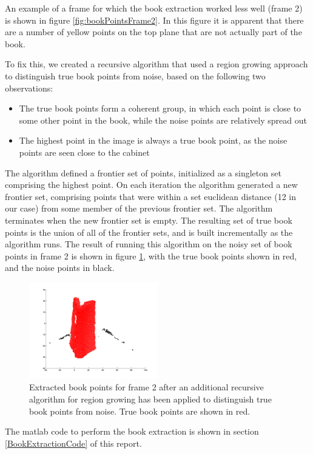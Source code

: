 An example of a frame for which the book extraction worked less well (frame 2) is shown in figure \ref{fig:bookPointsFrame2}. In this figure it is apparent that there are a number of yellow points on the top plane that are not actually part of the book.

To fix this, we created a recursive algorithm that used a region growing approach to distinguish true book points from noise, based on the following two observations:

\begin{itemize}
	\item The true book points form a coherent group, in which each point is close to some other point in the book, while the noise points are relatively spread out
	\item The highest point in the image is always a true book point, as the noise points are seen close to the cabinet
\end{itemize}

The algorithm defined a frontier set of points, initialized as a singleton set comprising the highest point. On each iteration the algorithm generated a new frontier set, comprising points that were within a set euclidean distance (12 in our case) from some member of the previous frontier set. The algorithm terminates when the new frontier set is empty. The resulting set of true book points is the union of all of the frontier sets, and is built incrementally as the algorithm runs. The result of running this algorithm on the noisy set of book points in frame 2 is shown in figure \ref{fig:bookPointsFrame2Cleaned}, with the true book points shown in red, and the noise points in black.


\begin{figure}[H]
	\centering
	\includegraphics[width=0.5\textwidth]{Images/6-RegionGrowingCleaning.png}
	\caption{Extracted book points for frame 2 after an additional recursive algorithm for region growing has been applied to distinguish true book points from noise. True book points are shown in red.}
	\label{fig:bookPointsFrame2Cleaned}
\end{figure}

The matlab code to perform the book extraction is shown in section \ref{BookExtractionCode} of this report.